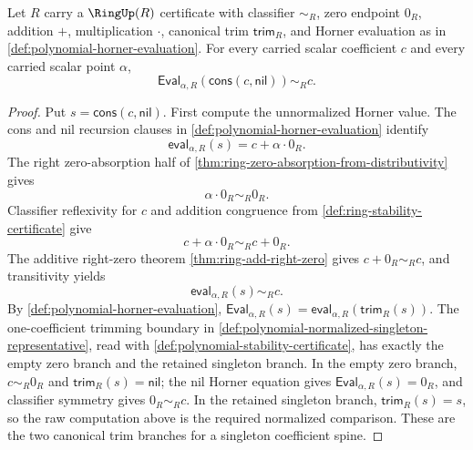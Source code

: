 \begin{theorem}
\label{thm:polynomial-singleton-evaluation}
Let $R$ carry a $\RingUp(R)$ certificate with classifier $\sim_R$, zero endpoint $0_R$, addition $+$, multiplication $\cdot$, canonical trim $\mathsf{trim}_R$, and Horner evaluation as in \autoref{def:polynomial-horner-evaluation}. For every carried scalar coefficient $c$ and every carried scalar point $\alpha$,
$$
\mathsf{Eval}_{\alpha,R}(\mathsf{cons}(c,\mathsf{nil}))\sim_R c.
$$
\end{theorem}
\begin{proof}
Put $s=\mathsf{cons}(c,\mathsf{nil})$. First compute the unnormalized Horner value. The cons and nil recursion clauses in \autoref{def:polynomial-horner-evaluation} identify
$$
\mathsf{eval}_{\alpha,R}(s)=c+\alpha\cdot0_R.
$$
The right zero-absorption half of \autoref{thm:ring-zero-absorption-from-distributivity} gives
$$
\alpha\cdot0_R\sim_R0_R.
$$
Classifier reflexivity for $c$ and addition congruence from \autoref{def:ring-stability-certificate} give
$$
c+\alpha\cdot0_R\sim_Rc+0_R.
$$
The additive right-zero theorem \autoref{thm:ring-add-right-zero} gives $c+0_R\sim_Rc$, and transitivity yields
$$
\mathsf{eval}_{\alpha,R}(s)\sim_Rc.
$$
By \autoref{def:polynomial-horner-evaluation}, $\mathsf{Eval}_{\alpha,R}(s)=\mathsf{eval}_{\alpha,R}(\mathsf{trim}_R(s))$. The one-coefficient trimming boundary in \autoref{def:polynomial-normalized-singleton-representative}, read with \autoref{def:polynomial-stability-certificate}, has exactly the empty zero branch and the retained singleton branch. In the empty zero branch, $c\sim_R0_R$ and $\mathsf{trim}_R(s)=\mathsf{nil}$; the nil Horner equation gives $\mathsf{Eval}_{\alpha,R}(s)=0_R$, and classifier symmetry gives $0_R\sim_Rc$. In the retained singleton branch, $\mathsf{trim}_R(s)=s$, so the raw computation above is the required normalized comparison. These are the two canonical trim branches for a singleton coefficient spine.
\end{proof}

